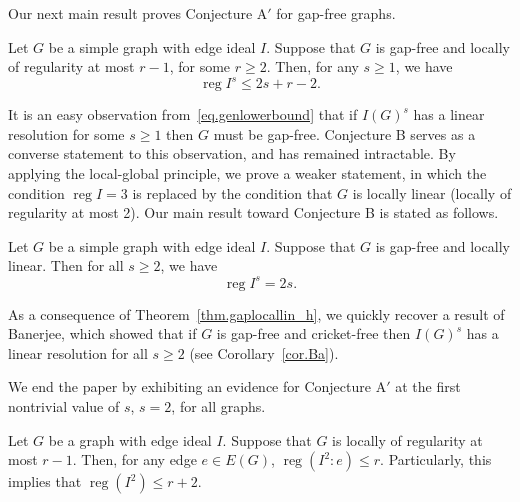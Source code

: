 \documentclass[ALCO,ThmDefs,Unicode,epreuves]{cedram}
\DeclareMathOperator{\reg}{reg}
\newcommand*{\reg}{\mathrm{reg}}
\begin{document}
Our next main result proves Conjecture $\text{A}'$ for gap-free graphs.

\begingroup
\setcounter{cdrthm}{1}
\def\thecdrthm{4.\arabic{cdrthm}}
\begin{theo}\label{thm.gaplocal_h} 
Let $G$ be a simple graph with edge ideal $I$. Suppose that $G$ is gap-free and locally of regularity at most $r-1$, for some $r \ge 2$. Then, for any $s \ge 1$, we have
\[
\reg I^s \le 2s+r-2.
\]

\end{theo}

It is an easy observation from~\eqref{eq.genlowerbound} that if $I(G)^s$ has a linear resolution for some $s \ge 1$ then $G$ must be gap-free. Conjecture B serves as a converse statement to this observation, and has remained intractable. By applying the local-global principle, we prove a weaker statement, in which the condition $\reg I = 3$ is replaced by the condition that $G$ is locally linear (\ie locally of regularity at most 2). Our main result toward Conjecture B is stated as follows.

\setcounter{cdrthm}{4}
\begin{theo}\label{thm.gaplocallin_h} 
Let $G$ be a simple graph with edge ideal $I$. Suppose that $G$ is gap-free and locally linear. Then for all $s \ge 2$, we have
\[
\reg I^s = 2s.
\]

\end{theo}

As a consequence of Theorem~\ref{thm.gaplocallin_h}, we quickly recover a result of Banerjee, which showed that if $G$ is gap-free and cricket-free then $I(G)^s$ has a linear resolution for all $s \ge 2$ (see Corollary~\ref{cor.Ba}).

We end the paper by exhibiting an evidence for Conjecture $\text{A}'$ at the first nontrivial value of $s$, \ie $s = 2$, for all graphs.

\setcounter{cdrthm}{0}
\def\thecdrthm{5.\arabic{cdrthm}}
\begin{theo}\label{thm.square_h} 
Let $G$ be a graph with edge ideal $I$. Suppose that $G$ is locally of regularity at most $r-1$. Then, for any edge $e \in E(G)$, $\reg (I^2:e) \le r.$ Particularly, this implies that $\reg (I^2) \le r+2.$
\end{theo}
\end{document}
